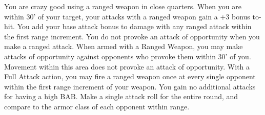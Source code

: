 {You are crazy good using a ranged weapon in close quarters.}
{When you are within 30' of your target, your attacks with a ranged weapon gain a +3 bonus to-hit.}
{You add your base attack bonus to damage with any ranged attack within the first range increment.}
{You do not provoke an attack of opportunity when you make a ranged attack.}
{When armed with a Ranged Weapon, you may make attacks of opportunity against opponents who provoke them within 30' of you. Movement within this area does not provoke an attack of opportunity.}
{With a Full Attack action, you may fire a ranged weapon once at every single opponent within the first range increment of your weapon. You gain no additional attacks for having a high BAB. Make a single attack roll for the entire round, and compare to the armor class of each opponent within range.}